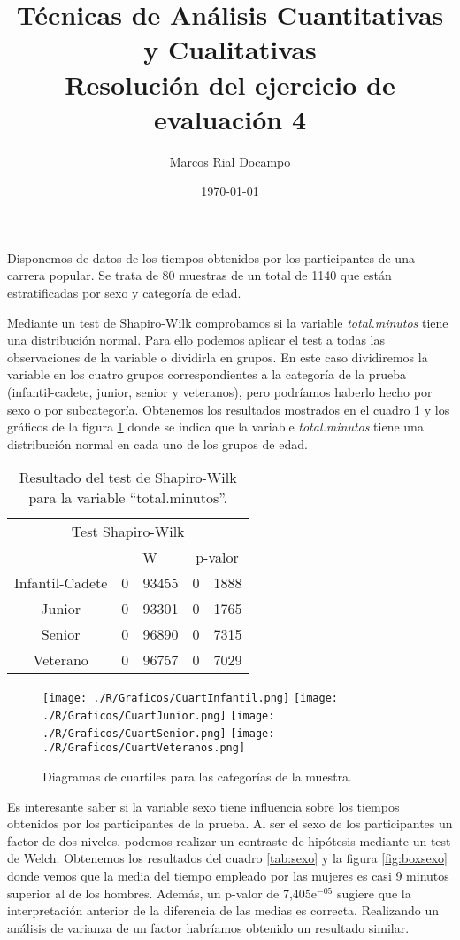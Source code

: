 \documentclass[11pt,a4paper]{article}
\author{Marcos Rial Docampo}
\title{Técnicas de Análisis Cuantitativas y Cualitativas\\Resolución del ejercicio de evaluación 4}
\date{\small{\today}}
\begin{document}
\maketitle

Disponemos de datos de los tiempos obtenidos por los participantes de una carrera popular. Se trata de 80 muestras de un total de 1140 que están estratificadas por sexo y categoría de edad.

Mediante un test de Shapiro-Wilk comprobamos si la variable \textit{total.minutos} tiene una distribución normal. Para ello podemos aplicar el test a todas las observaciones de la variable o dividirla en grupos. En este caso dividiremos la variable en los cuatro grupos correspondientes a la categoría de la prueba (infantil-cadete, junior, senior y veteranos), pero podríamos haberlo hecho por sexo o por subcategoría. Obtenemos los resultados mostrados en el cuadro \ref{tab:Shapiro} y los gráficos de la figura \ref{fig:diagrama} donde se indica que la variable \textit{total.minutos} tiene una distribución normal en cada uno de los grupos de edad.

\begin{table}[ht]
\centering
\begin{tabular}{cr@{,}lr@{,}l}
\toprule[0.4mm]
\multicolumn{5}{c}{Test Shapiro-Wilk}\\
 & \multicolumn{2}{c}{W} & \multicolumn{2}{c}{p-valor}\\
\midrule
Infantil-Cadete & 0&93455 & 0&1888\\
Junior & 0&93301 & 0&1765\\
Senior & 0&96890 & 0&7315\\
Veterano & 0&96757 & 0&7029\\
\bottomrule[0.4mm]
\end{tabular}
\caption{Resultado del test de Shapiro-Wilk para la variable ``total.minutos''.}
\label{tab:Shapiro}
\end{table}

\begin{figure}
\centering
\texttt{[image: ./R/Graficos/CuartInfantil.png]}
\texttt{[image: ./R/Graficos/CuartJunior.png]}
\texttt{[image: ./R/Graficos/CuartSenior.png]}
\texttt{[image: ./R/Graficos/CuartVeteranos.png]}
\caption{Diagramas de cuartiles para las categorías de la muestra.}
\label{fig:diagrama}
\end{figure}

Es interesante saber si la variable sexo tiene influencia sobre los tiempos obtenidos por los participantes de la prueba. Al ser el sexo de los participantes un factor de dos niveles, podemos realizar un contraste de hipótesis mediante un test de Welch. Obtenemos los resultados del cuadro \ref{tab:sexo} y la figura \ref{fig:boxsexo} donde vemos que la media del tiempo empleado por las mujeres es casi 9 minutos superior al de los hombres. Además, un p-valor de 7,405e$^{-05}$ sugiere que la interpretación anterior de la diferencia de las medias es correcta. Realizando un análisis de varianza de un factor habríamos obtenido un resultado similar.
\end{document}
